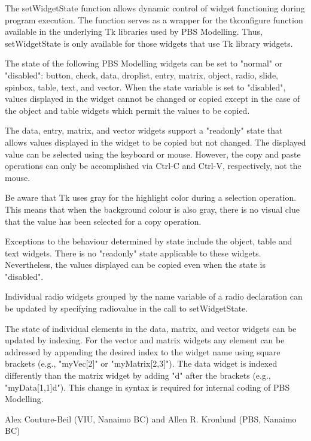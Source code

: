 \documentclass[letterpaper]{book}
\begin{document}
\begin{Details}\relax
The setWidgetState function allows dynamic control of widget functioning during program execution.  The function serves as a wrapper for the tkconfigure function available in the underlying Tk libraries used by PBS Modelling.  Thus, setWidgetState is only available for those widgets that use Tk library widgets.

The state of the following PBS Modelling widgets can be set to "normal" or "disabled": button, check, data, droplist, entry, matrix, object, radio, slide, spinbox, table, text, and vector.  When the state variable is set to "disabled", values displayed in the widget cannot be changed or copied except in the case of the object and table widgets which permit the values to be copied.

The data, entry, matrix, and vector widgets support a "readonly" state that allows values displayed in the widget to be copied but not changed.  The displayed value can be selected using the keyboard or mouse.  However, the copy and paste operations can only be accomplished via Ctrl-C and Ctrl-V, respectively, not the mouse.

Be aware that Tk uses gray for the highlight color during a selection operation.  This means that when the background colour is also gray, there is no visual clue that the value has been selected for a copy operation.

Exceptions to the behaviour determined by state include the object, table and text widgets.  There is no "readonly" state applicable to these widgets.  Nevertheless, the values displayed can be copied even when the state is "disabled".

Individual radio widgets grouped by the name variable of a radio declaration can be updated by specifying radiovalue in the call to setWidgetState.

The state of individual elements in the data, matrix, and vector widgets can be updated by indexing.  For the vector and matrix widgets any element can be addressed by appending the desired index to the widget name using square brackets (e.g., "myVec[2]" or "myMatrix[2,3]").  The data widget is indexed differently than the matrix widget by adding "d" after the brackets (e.g., "myData[1,1]d").  This change in syntax is required for internal coding of PBS Modelling.
\end{Details}
%
\begin{Author}\relax
Alex Couture-Beil (VIU, Nanaimo BC) and Allen R. Kronlund (PBS, Nanaimo BC)
\end{Author}
\end{document}
